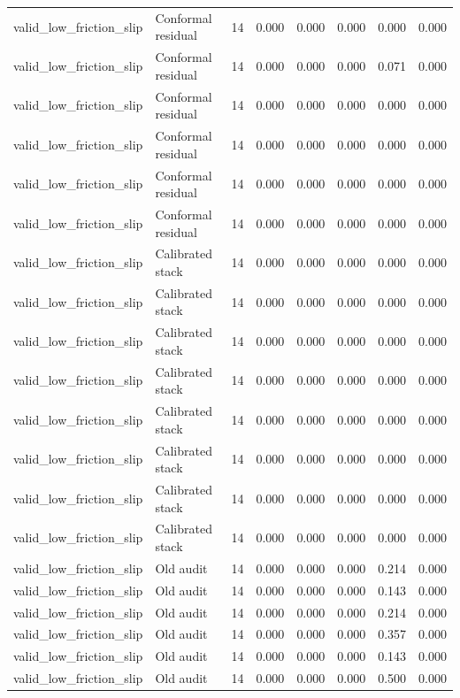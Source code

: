 {\begin{longtable}{llrrrrrr}
valid\_low\_friction\_slip & Conformal residual & 14 & 0.000 & 0.000 & 0.000 & 0.000 & 0.000 \\
valid\_low\_friction\_slip & Conformal residual & 14 & 0.000 & 0.000 & 0.000 & 0.071 & 0.000 \\
valid\_low\_friction\_slip & Conformal residual & 14 & 0.000 & 0.000 & 0.000 & 0.000 & 0.000 \\
valid\_low\_friction\_slip & Conformal residual & 14 & 0.000 & 0.000 & 0.000 & 0.000 & 0.000 \\
valid\_low\_friction\_slip & Conformal residual & 14 & 0.000 & 0.000 & 0.000 & 0.000 & 0.000 \\
valid\_low\_friction\_slip & Conformal residual & 14 & 0.000 & 0.000 & 0.000 & 0.000 & 0.000 \\
valid\_low\_friction\_slip & Calibrated stack & 14 & 0.000 & 0.000 & 0.000 & 0.000 & 0.000 \\
valid\_low\_friction\_slip & Calibrated stack & 14 & 0.000 & 0.000 & 0.000 & 0.000 & 0.000 \\
valid\_low\_friction\_slip & Calibrated stack & 14 & 0.000 & 0.000 & 0.000 & 0.000 & 0.000 \\
valid\_low\_friction\_slip & Calibrated stack & 14 & 0.000 & 0.000 & 0.000 & 0.000 & 0.000 \\
valid\_low\_friction\_slip & Calibrated stack & 14 & 0.000 & 0.000 & 0.000 & 0.000 & 0.000 \\
valid\_low\_friction\_slip & Calibrated stack & 14 & 0.000 & 0.000 & 0.000 & 0.000 & 0.000 \\
valid\_low\_friction\_slip & Calibrated stack & 14 & 0.000 & 0.000 & 0.000 & 0.000 & 0.000 \\
valid\_low\_friction\_slip & Calibrated stack & 14 & 0.000 & 0.000 & 0.000 & 0.000 & 0.000 \\
valid\_low\_friction\_slip & Old audit & 14 & 0.000 & 0.000 & 0.000 & 0.214 & 0.000 \\
valid\_low\_friction\_slip & Old audit & 14 & 0.000 & 0.000 & 0.000 & 0.143 & 0.000 \\
valid\_low\_friction\_slip & Old audit & 14 & 0.000 & 0.000 & 0.000 & 0.214 & 0.000 \\
valid\_low\_friction\_slip & Old audit & 14 & 0.000 & 0.000 & 0.000 & 0.357 & 0.000 \\
valid\_low\_friction\_slip & Old audit & 14 & 0.000 & 0.000 & 0.000 & 0.143 & 0.000 \\
valid\_low\_friction\_slip & Old audit & 14 & 0.000 & 0.000 & 0.000 & 0.500 & 0.000 \\

\end{longtable}}
